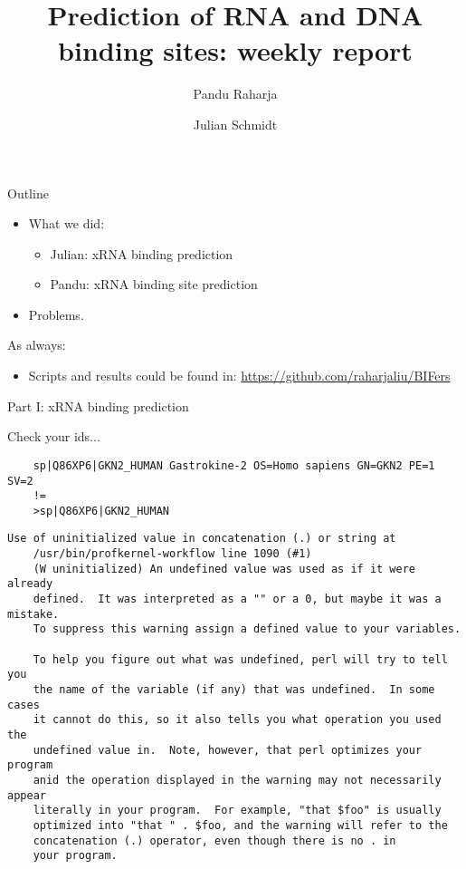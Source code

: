 \documentclass[pdf]
{beamer}
\title{Prediction of RNA and DNA binding sites: weekly report}
\subtitle{}
\author[shortname]{Pandu Raharja \inst{1, 2} \and Julian Schmidt \inst{1, 2}}
\institute[shortinst]{\inst{1} Technische Universit\"at M\"unchen \and %
                      \inst{2} Ludwig-Maximilians-Universit\"at M\"unchen}
\begin{document}
\begin{frame}
\titlepage
\end{frame}

\begin{frame}{Outline}
	\begin{itemize}
		\item What we did:
		\begin{itemize}
			\item Julian: xRNA binding prediction
			\item Pandu: xRNA binding site prediction
		\end{itemize}
		\item Problems.  
	\end{itemize}
\end{frame}

\begin{frame}{As always:}
	\begin{itemize}
		\item Scripts and results could be found in:
		\href{https://github.com/raharjaliu/BIFers}{https://github.com/raharjaliu/BIFers}
	\end{itemize}
\end{frame}

\begin{frame}
	\begin{center}
		\Large Part I: xRNA binding prediction
	\end{center}
\end{frame}

\begin{frame}[fragile]
	\begin{center}
	\large Check your ids...
	\begin{small}
	\begin{verbatim}
	sp|Q86XP6|GKN2_HUMAN Gastrokine-2 OS=Homo sapiens GN=GKN2 PE=1 SV=2
	!=
	>sp|Q86XP6|GKN2_HUMAN
	\end{verbatim}
	\end{small}
	\begin{tiny}
		\begin{verbatim}
Use of uninitialized value in concatenation (.) or string at
	/usr/bin/profkernel-workflow line 1090 (#1)
    (W uninitialized) An undefined value was used as if it were already
    defined.  It was interpreted as a "" or a 0, but maybe it was a mistake.
    To suppress this warning assign a defined value to your variables.
    
    To help you figure out what was undefined, perl will try to tell you
    the name of the variable (if any) that was undefined.  In some cases
    it cannot do this, so it also tells you what operation you used the
    undefined value in.  Note, however, that perl optimizes your program
    anid the operation displayed in the warning may not necessarily appear
    literally in your program.  For example, "that $foo" is usually
    optimized into "that " . $foo, and the warning will refer to the
    concatenation (.) operator, even though there is no . in
    your program.
		\end{verbatim}
		\end{tiny}
	\end{center}
\end{frame}
\end{document}
